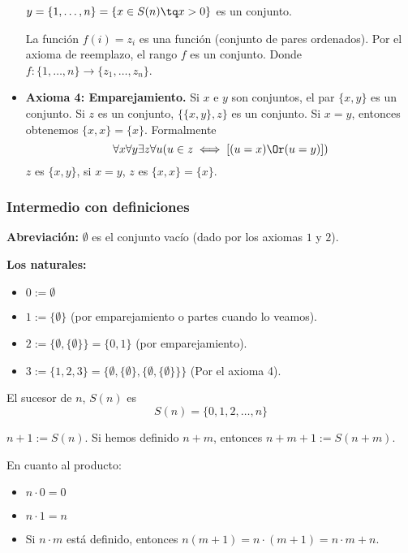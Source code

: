 \begin{itemize}
\begin{obs}
			$y=\{1, \hdots, n\} = \{x\in S(n)\tq x>0\}$ es un conjunto.
			
			La función $f(i) = z_i$ es una función (conjunto de pares ordenados). Por el axioma de reemplazo, el rango $f$ es un conjunto. Donde $f:\{1,\hdots, n\}\to \{z_1, \hdots, z_n\}$.
		\end{obs}
		
		\item \textbf{Axioma 4: Emparejamiento.} Si $x$ e $y$ son conjuntos, el par $\{x, y\}$ es un conjunto. Si $z$ es un conjunto, $\{\{x,y\},z\}$ es un conjunto. Si $x = y$, entonces obtenemos $\{x,x\} = \{x\}$. Formalmente
		$$\forall x\forall y\exists z\forall u(u\in z\iff \left[(u=x)\Or (u=y)\right])$$
		$z$ es $\{x,y\}$, si $x=y$, $z$ es $\{x,x\}=\{x\}$.
	\end{itemize}
	
	\subsubsection{Intermedio con definiciones}
	
	\textbf{Abreviación: } $\emptyset$ es el conjunto vacío (dado por los axiomas $1$ y $2$).
	
	\textbf{Los naturales:} 
	\begin{itemize}
		\item $0:=\emptyset$
		\item $1:=\{\emptyset\}$ (por emparejamiento o partes cuando lo veamos).
		\item $2:=\{\emptyset, \{\emptyset\}\} = \{0,1\}$ (por emparejamiento).
		\item $3:=\{1,2,3\} = \{\emptyset,\{\emptyset\},\{\emptyset, \{\emptyset\}\}\}$ (Por el axioma 4).
	\end{itemize}
	\begin{defn}[Sucesor]
		El sucesor de $n$, $S(n)$ es $$S(n) = \{0,1,2,\hdots, n\}$$
	\end{defn}
	
	\begin{defn}
		$n+1 := S(n)$. Si hemos definido $n+m$, entonces
		$n+m+1 := S(n+m)$.
	\end{defn}
	
	\begin{defn}
		En cuanto al producto:
		\begin{itemize}
			\item $n\cdot0 = 0$
			\item $n\cdot1=n$
			\item Si $n\cdot m$ está definido, entonces $n(m+1) = n\cdot (m+1) = n\cdot m + n$.
		\end{itemize}
	\end{defn}
	
